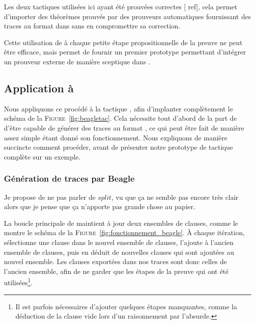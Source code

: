 Les deux tactiques utilisées ici ayant été prouvées correctes [\todo
ref], cela permet d'importer des théorèmes prouvés par des prouveurs
automatiques fournissant des traces au format \tff dans \holfour sans en
compromettre sa correction.

Cette utilisation de \metistac à chaque petite étape propositionnelle de
la preuve ne peut être efficace, mais permet de fournir un premier
prototype permettant d'intégrer un prouveur externe de manière sceptique
dans \holfour.


\subsection{Application à \beagle}

Nous appliquons ce procédé à la tactique \beagletac, afin d'implanter
complètement le schéma de la \textsc{Figure}~\ref{fig:beagletac}. Cela
nécessite tout d'abord de la part de \beagle d'être capable de générer
des traces au format \tff, ce qui peut être fait de manière assez simple
étant donné son fonctionnement. Nous expliquons de manière succincte
comment procéder, avant de présenter notre prototype de tactique
\beagletac complète sur un exemple.


\subsubsection{Génération de traces par Beagle}
\todo Je propose de ne pas parler de $split$, vu que ça ne semble pas
encore très clair alors que je pense que ça n'apporte pas grande chose
au papier.

La boucle principale de \beagle maintient à jour deux ensembles de
clauses, comme le montre le schéma de la
\textsc{Figure}~\ref{fig:fonctionnement_beagle}. À chaque itération,
\beagle sélectionne une clause dans le nouvel ensemble de clauses,
l'ajoute à l'ancien ensemble de clauses, puis en déduit de nouvelles
clauses qui sont ajoutées au nouvel ensemble. Les clauses exportées dans
nos traces sont donc celles de l'ancien ensemble, afin de ne garder que
les étapes de la preuve qui ont été utilisées\footnote{Il est parfois
  nécessaires d'ajouter quelques étapes manquantes, comme la déduction
  de la clause vide lors d'un raisonnement par l'absurde.}.


